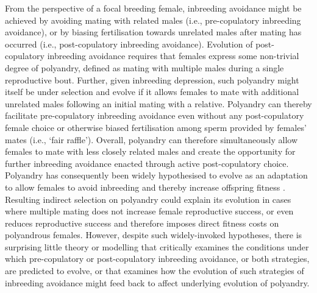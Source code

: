 \documentclass[12pt]{article}
\begin{document}
From the perspective of a focal breeding female, inbreeding avoidance might be achieved by avoiding mating with related males (i.e., pre-copulatory inbreeding avoidance), or by biasing fertilisation towards unrelated males after mating has occurred (i.e., post-copulatory inbreeding avoidance). Evolution of post-copulatory inbreeding avoidance requires that females express some non-trivial degree of polyandry, defined as mating with multiple males during a single reproductive bout. Further, given inbreeding depression, such polyandry might itself be under selection and evolve if it allows females to mate with additional unrelated males following an initial mating with a relative. Polyandry can thereby facilitate pre-copulatory inbreeding avoidance even without any post-copulatory female choice or otherwise biased fertilisation among sperm provided by females' mates (i.e., `fair raffle'). Overall, polyandry can therefore simultaneously allow females to mate with less closely related males and create the opportunity for further inbreeding avoidance enacted through active post-copulatory choice. Polyandry has consequently been widely hypothesised to evolve as an adaptation to allow females to avoid inbreeding and thereby increase offspring fitness \cite[][]{Zeh1997, Jennions2000, Tregenza2002}. Resulting indirect selection on polyandry could explain its evolution in cases where multiple mating does not increase female reproductive success, or even reduces reproductive success and therefore imposes direct fitness costs on polyandrous females. However, despite such widely-invoked hypotheses, there is surprising little theory or modelling that critically examines the conditions under which pre-copulatory or post-copulatory inbreeding avoidance, or both strategies, are predicted to evolve, or that examines how the evolution of such strategies of inbreeding avoidance might feed back to affect underlying evolution of polyandry.
\end{document}
